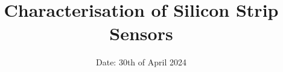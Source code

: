 

\title{Characterisation of Silicon Strip Sensors}
\date{%
  Date: 30th of April 2024
}




\maketitle
\thispagestyle{empty}
\tableofcontents
\newpage






\printbibliography{}

% 


